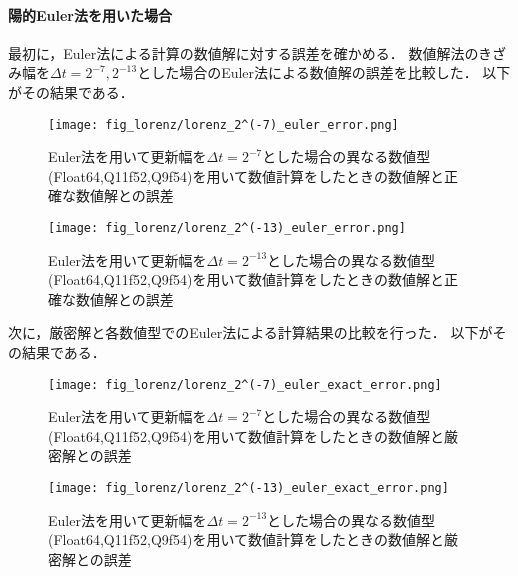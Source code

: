 \paragraph*{陽的Euler法を用いた場合}
最初に，Euler法による計算の数値解に対する誤差を確かめる．
数値解法のきざみ幅を$\Delta t = 2^{-7},2^{-13}$とした場合のEuler法による数値解の誤差を比較した．
以下がその結果である．
\begin{figure}[H]
    \centering
    \begin{minipage}[b]{0.49\columnwidth}
        \centering
        \texttt{[image: fig\_lorenz/lorenz\_2^(-7)\_euler\_error.png]}
        \caption{Euler法を用いて更新幅を$\Delta t = 2^{-7}$とした場合の異なる数値型(Float64,Q11f52,Q9f54)を用いて数値計算をしたときの数値解と正確な数値解との誤差}
        \label{fig:lorenz_2^(-7)_euler_error}
    \end{minipage}
    \begin{minipage}[b]{0.49\columnwidth}
        \centering
        \texttt{[image: fig\_lorenz/lorenz\_2^(-13)\_euler\_error.png]}
        \caption{Euler法を用いて更新幅を$\Delta t =  2^{-13}$とした場合の異なる数値型(Float64,Q11f52,Q9f54)を用いて数値計算をしたときの数値解と正確な数値解との誤差}
        \label{fig:lorenz_2^(-13)_euler_error}
    \end{minipage}
\end{figure}
次に，厳密解と各数値型でのEuler法による計算結果の比較を行った．
以下がその結果である．
\begin{figure}[H]
    \centering
    \begin{minipage}[b]{0.49\columnwidth}
        \centering
        \texttt{[image: fig\_lorenz/lorenz\_2^(-7)\_euler\_exact\_error.png]}
        \caption{Euler法を用いて更新幅を$\Delta t = 2^{-7}$とした場合の異なる数値型(Float64,Q11f52,Q9f54)を用いて数値計算をしたときの数値解と厳密解との誤差}
        \label{fig:lorenz_2^(-7)_exact_error}
    \end{minipage}
    \begin{minipage}[b]{0.49\columnwidth}
        \centering
        \texttt{[image: fig\_lorenz/lorenz\_2^(-13)\_euler\_exact\_error.png]}
        \caption{Euler法を用いて更新幅を$\Delta t =  2^{-13}$とした場合の異なる数値型(Float64,Q11f52,Q9f54)を用いて数値計算をしたときの数値解と厳密解との誤差}
        \label{fig:lorenz_2^(-13)_exact_error}
    \end{minipage}
\end{figure}

